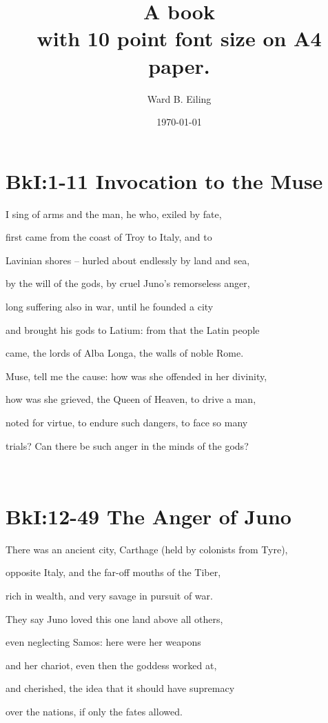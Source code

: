 \documentclass[10pt, a4paper, titlepage]{book}
\title{A book \\ \small with 10 point font size on A4 paper.}
\author{Ward B. Eiling}
\date{\today}
\begin{document}
\maketitle
\newpage

\section*{BkI:1-11 Invocation to the Muse}

I sing of arms and the man, he who, exiled by fate,

first came from the coast of Troy to Italy, and to

Lavinian shores – hurled about endlessly by land and sea,

by the will of the gods, by cruel Juno’s remorseless anger,

long suffering also in war, until he founded a city

and brought his gods to Latium: from that the Latin people

came, the lords of Alba Longa, the walls of noble Rome.

Muse, tell me the cause: how was she offended in her divinity,

how was she grieved, the Queen of Heaven, to drive a man,

noted for virtue, to endure such dangers, to face so many

trials? Can there be such anger in the minds of the gods?


\\


\section*{BkI:12-49 The Anger of Juno}

There was an ancient city, Carthage (held by colonists from Tyre),

opposite Italy, and the far-off mouths of the Tiber,

rich in wealth, and very savage in pursuit of war.

They say Juno loved this one land above all others,

even neglecting Samos: here were her weapons

and her chariot, even then the goddess worked at,

and cherished, the idea that it should have supremacy

over the nations, if only the fates allowed.
\end{document}
